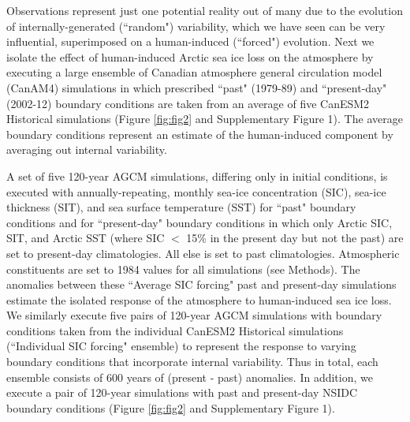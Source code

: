 \documentclass{nature}
\begin{document}


Observations represent just one potential reality out of many due to the evolution of internally-generated (``random") variability, which we have seen can be very influential, superimposed on a human-induced (``forced") evolution. Next we isolate the effect of human-induced Arctic sea ice loss on the atmosphere by executing a large ensemble of Canadian atmosphere general circulation model (CanAM4) simulations in which prescribed ``past" (1979-89) and ``present-day" (2002-12) boundary conditions are taken from an average of five CanESM2 Historical simulations (Figure \ref{fig:fig2} and Supplementary Figure 1). The average boundary conditions represent an estimate of the human-induced component by averaging out internal variability. 

A set of five 120-year AGCM simulations, differing only in initial conditions, is executed with annually-repeating, monthly sea-ice concentration (SIC), sea-ice thickness (SIT), and sea surface temperature (SST) for ``past" boundary conditions and for ``present-day" boundary conditions in which only Arctic SIC, SIT, and Arctic SST (where SIC $<$ 15\% in the present day but not the past) are set to present-day climatologies. All else is set to past climatologies. Atmospheric constituents are set to 1984 values for all simulations (see Methods). The anomalies between these ``Average SIC forcing" past and present-day simulations estimate the isolated response of the atmosphere to human-induced sea ice loss. We similarly execute five pairs of 120-year AGCM simulations with boundary conditions taken from the individual CanESM2 Historical simulations (``Individual SIC forcing" ensemble) to represent the response to varying boundary conditions that incorporate internal variability. Thus in total, each ensemble consists of 600 years of (present - past) anomalies. In addition, we execute a pair of 120-year simulations with past and present-day NSIDC boundary conditions (Figure \ref{fig:fig2} and Supplementary Figure 1).
\end{document}
